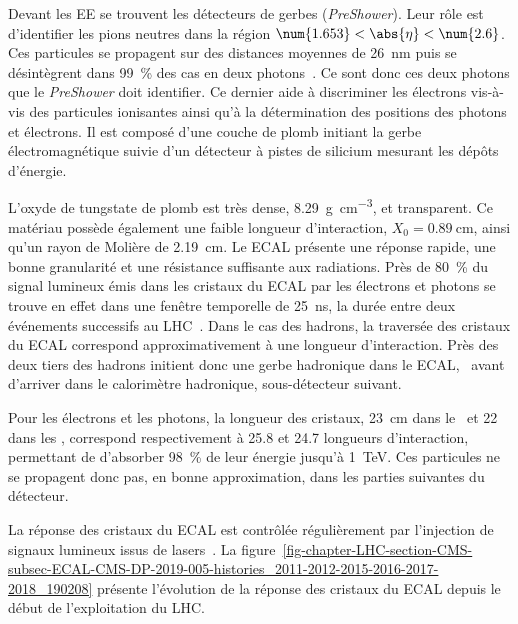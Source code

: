 \par Devant les EE se trouvent les détecteurs de gerbes (\emph{PreShower}).
Leur rôle est d'identifier les pions neutres dans la région $\num{1.653}<\abs{\eta}<\num{2.6}$.
Ces particules se propagent sur des distances moyennes de \SI{26}{\nano\meter} puis se désintègrent dans \SI{99}{\%} des cas en deux photons~\cite{PDG_booklet_2020}.
Ce sont donc ces deux photons que le \emph{PreShower} doit identifier.
Ce dernier aide à discriminer les électrons vis-à-vis des particules ionisantes ainsi qu'à la détermination des positions des photons et électrons.
Il est composé d'une couche de plomb initiant la gerbe électromagnétique suivie d'un détecteur à pistes de silicium mesurant les dépôts d'énergie.
\par L'oxyde de tungstate de plomb est très dense, \SI{8.29}{\gram.\centi\meter^{-3}}, et transparent.
Ce matériau possède également une faible longueur d'interaction, $X_0=\SI{0.89}{\centi\meter}$, ainsi qu'un rayon de Molière de \SI{2.19}{\centi\meter}.
Le ECAL présente une réponse rapide, une bonne granularité et une résistance suffisante aux radiations.
Près de \SI{80}{\%} du signal lumineux émis dans les cristaux du ECAL par les électrons et photons se trouve en effet dans une fenêtre temporelle de \SI{25}{\nano\second}, la durée entre deux événements successifs au LHC~\cite{cms_paper}.
Dans le cas des hadrons, la traversée des cristaux du ECAL correspond approximativement à une longueur d'interaction.
Près des deux tiers des hadrons initient donc une gerbe hadronique dans le ECAL, \ie\ avant d'arriver dans le calorimètre hadronique, sous-détecteur suivant.
\par Pour les électrons et les photons, la longueur des cristaux, \SI{23}{\centi\meter} dans le \CMSbarrel\ et \num{22} dans les \CMSendcaps, correspond respectivement à \num{25.8} et \num{24.7} longueurs d'interaction, permettant de d'absorber \SI{98}{\%} de leur énergie jusqu'à \SI{1}{\TeV}.
Ces particules ne se propagent donc pas, en bonne approximation, dans les parties suivantes du détecteur.
\par La réponse des cristaux du ECAL est contrôlée régulièrement par l'injection de signaux lumineux issus de lasers~\cite{CMS-DP-2019-005}.
La figure~\ref{fig-chapter-LHC-section-CMS-subsec-ECAL-CMS-DP-2019-005-histories_2011-2012-2015-2016-2017-2018_190208} présente l'évolution de la réponse des cristaux du ECAL depuis le début de l'exploitation du LHC.
